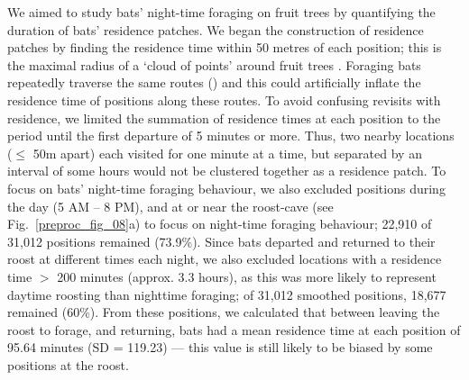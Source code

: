 We aimed to study bats' night-time foraging on fruit trees by quantifying the duration of bats' residence patches.
We began the construction of residence patches by finding the residence time within 50 metres of each position; this is the maximal radius of a `cloud of points' around fruit trees \citep{bracis2018}.
Foraging bats repeatedly traverse the same routes (\citealt{toledo2020, tsoar2011, lourie2021}) and this could artificially inflate the residence time of positions along these routes.
To avoid confusing revisits with residence, we limited the summation of residence times at each position to the period until the first departure of 5 minutes or more.
Thus, two nearby locations ($\leq$ 50m apart) each visited for one minute at a time, but separated by an interval of some hours would not be clustered together as a residence patch. 
To focus on bats' night-time foraging behaviour, we also excluded positions during the day (5 AM -- 8 PM), and at or near the roost-cave (see Fig.~\ref{preproc_fig_08}a) to focus on night-time foraging behaviour; 22,910 of 31,012 positions remained (73.9\%).
Since bats departed and returned to their roost at different times each night, we also excluded locations with a residence time $>$ 200 minutes (approx. 3.3 hours), as this was more likely to represent daytime roosting than nighttime foraging; of 31,012 smoothed positions, 18,677 remained (60\%).
From these positions, we calculated that between leaving the roost to forage, and returning, bats had a mean residence time at each position of 95.64 minutes (SD = 119.23) --- this value is still likely to be biased by some positions at the roost.

